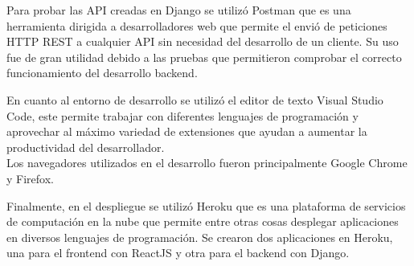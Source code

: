 \documentclass[../Main.tex]{subfiles}
\begin{document}
    \begin{justify}
    Para probar las API creadas en Django se utilizó Postman que es una herramienta dirigida a desarrolladores web que permite el envió de peticiones HTTP REST a cualquier API sin necesidad del desarrollo de un cliente. Su uso fue de gran utilidad debido a las pruebas que permitieron comprobar el correcto funcionamiento del desarrollo backend.
    \end{justify}
    
    \begin{justify}
    En cuanto al entorno de desarrollo se utilizó el editor de texto Visual Studio Code, este permite trabajar con diferentes lenguajes de programación y aprovechar al máximo variedad de extensiones que ayudan a aumentar la productividad del desarrollador.\\
    Los navegadores utilizados en el desarrollo fueron principalmente Google Chrome y Firefox.
    \end{justify}
    
    \begin{justify}
    Finalmente, en el despliegue se utilizó Heroku que es una plataforma de servicios de computación en la nube que permite entre otras cosas desplegar aplicaciones en diversos lenguajes de programación. Se crearon dos aplicaciones en Heroku, una para el frontend con ReactJS y otra para el backend con Django.
    \end{justify}
    
\end{document}
